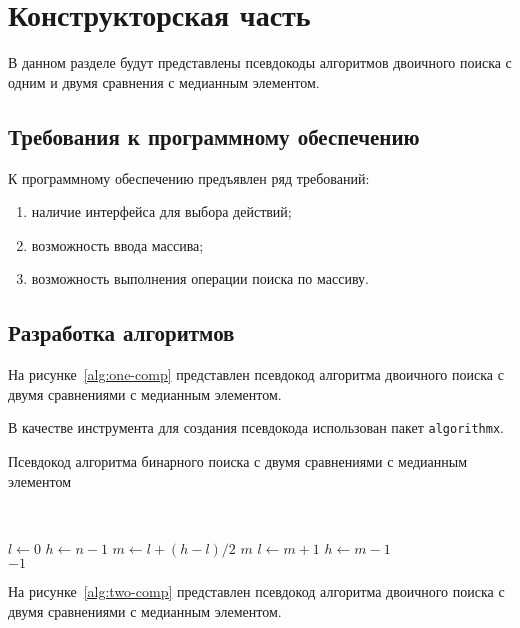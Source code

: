 \chapter{Конструкторская часть}

В данном разделе будут представлены псевдокоды алгоритмов двоичного поиска с одним и двумя сравнения с медианным элементом. 

\section{Требования к программному обеспечению}

К программному обеспечению предъявлен ряд требований:
\begin{enumerate}
	\item наличие интерфейса для выбора действий;
	\item возможность ввода массива;
	\item возможность выполнения операции поиска по массиву.
\end{enumerate}

\section{Разработка алгоритмов}

На рисунке~\ref{alg:one-comp} представлен псевдокод алгоритма двоичного поиска с двумя сравнениями с медианным элементом.

В качестве инструмента для создания псевдокода использован пакет \texttt{algorithmx}.

\begin{algorithm}[H]
	\caption{Псевдокод алгоритма бинарного поиска с двумя сравнениями с медианным элементом}
	\label{alg:one-comp}
	\\
	\begin{algorithmic}[1]
		\State $l\gets 0$
		\State $h\gets n - 1$
		\State $m\gets l + (h - l) / 2$
			\Return $m$
			\State $l\gets m + 1$
		\Else
			\State $h\gets m - 1$
		\EndIf
		\EndWhile
		\\ \Return $-1$
		\EndFunction
	\end{algorithmic}
\end{algorithm}

На рисунке~\ref{alg:two-comp} представлен псевдокод алгоритма двоичного поиска с двумя сравнениями с медианным элементом.


